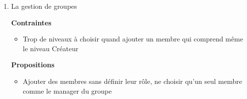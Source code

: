 \begin{enumerate}
    \item La gestion de groupes

    \textbf{Contraintes}
    \begin{itemize}
        \item Trop de niveaux à choisir quand ajouter un membre qui comprend même le niveau Créateur
    \end{itemize}
    \textbf{Propositions} 
    \begin{itemize}
        \item Ajouter des membres sans définir leur rôle, ne choisir qu'un seul membre comme le manager du groupe 
    \end{itemize}   
\end{enumerate}